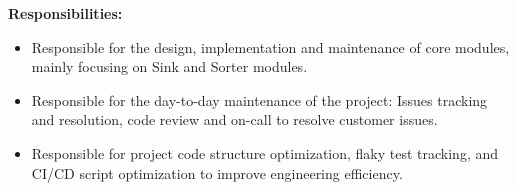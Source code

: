 \documentclass{resume}
\newcommand{\en}[1]{#1}
\newcommand{\zh}[1]{}
\begin{document}
\en{\textbf{Responsibilities:}}
\zh{\textbf{职责：}}
\begin{itemize}
      \item \en{Responsible for the design, implementation and maintenance of core modules, mainly focusing on Sink and Sorter modules.}
            \zh{负责核心模块的设计、实现和维护，主要聚焦于 Sink 和 Sorter 模块。}
      \item \en{Responsible for the day-to-day maintenance of the project: Issues tracking and resolution, code review and on-call to resolve customer issues.}
            \zh{负责项目日常的维护：Issues 追踪和解决、代码审阅和 on-call 解决客户问题。}
      \item \en{Responsible for project code structure optimization, flaky test tracking, and CI/CD script optimization to improve engineering efficiency.}
            \zh{负责项目代码结构优化、不稳定测试追踪，CI/CD 脚本优化，提升工程效率。}
\end{itemize}
\end{document}
